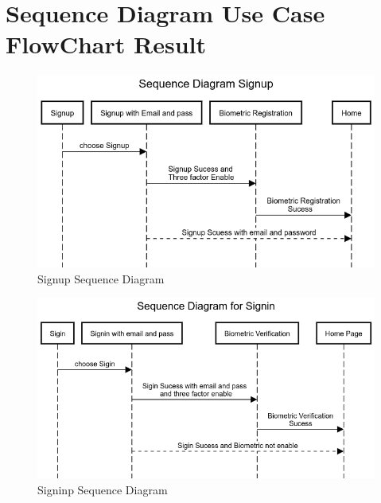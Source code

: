 \documentclass[conference]{IEEEtran}
\begin{document}
\section{Sequence Diagram Use Case FlowChart Result}
\begin{figure}[htbp]
	\centerline{\includegraphics[width=1.0\columnwidth]{sequp.png}}
	\caption{Signup Sequence Diagram}
	\label{fig}
\end{figure}
\begin{figure}[htbp]
	\centerline{\includegraphics[width=1.0\columnwidth]{seqin.png}}
	\caption{Signinp Sequence Diagram}
	\label{fig}
\end{figure}
\end{document}
